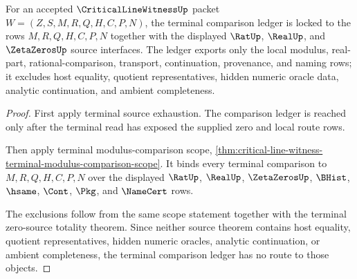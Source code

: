\begin{theorem}
\label{thm:critical-line-witness-terminal-comparison-ledger-lock}
For an accepted $\CriticalLineWitnessUp$ packet $W=(Z,S,M,R,Q,H,C,P,N)$, the terminal comparison ledger is locked to the rows $M,R,Q,H,C,P,N$ together with the displayed $\RatUp$, $\RealUp$, and $\ZetaZerosUp$ source interfaces. The ledger exports only the local modulus, real-part, rational-comparison, transport, continuation, provenance, and naming rows; it excludes host equality, quotient representatives, hidden numeric oracle data, analytic continuation, and ambient completeness.
\end{theorem}
\begin{proof}
First apply terminal source exhaustion. The comparison ledger is reached only after the terminal read has exposed the supplied zero and local route rows.

Then apply terminal modulus-comparison scope, \autoref{thm:critical-line-witness-terminal-modulus-comparison-scope}. It binds every terminal comparison to $M,R,Q,H,C,P,N$ over the displayed $\RatUp$, $\RealUp$, $\ZetaZerosUp$, $\BHist$, $\hsame$, $\Cont$, $\Pkg$, and $\NameCert$ rows.

The exclusions follow from the same scope statement together with the terminal zero-source totality theorem. Since neither source theorem contains host equality, quotient representatives, hidden numeric oracles, analytic continuation, or ambient completeness, the terminal comparison ledger has no route to those objects.
\end{proof}

